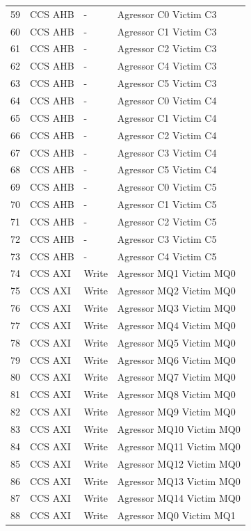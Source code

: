 \begin{center}
\begin{longtable}{|l|l|l|l|}
59 & CCS AHB &  -  &  Agressor C0 Victim C3\\
60 & CCS AHB &  -  &  Agressor C1 Victim C3\\
61 & CCS AHB &  -  &  Agressor C2 Victim C3\\
62 & CCS AHB &  -  &  Agressor C4 Victim C3\\
63 & CCS AHB &  -  &  Agressor C5 Victim C3\\
64 & CCS AHB &  -  &  Agressor C0 Victim C4\\
65 & CCS AHB &  -  &  Agressor C1 Victim C4\\
66 & CCS AHB &  -  &  Agressor C2 Victim C4\\
67 & CCS AHB &  -  &  Agressor C3 Victim C4\\
68 & CCS AHB &  -  &  Agressor C5 Victim C4\\
69 & CCS AHB &  -  &  Agressor C0 Victim C5\\
70 & CCS AHB &  -  &  Agressor C1 Victim C5\\
71 & CCS AHB &  -  &  Agressor C2 Victim C5\\
72 & CCS AHB &  -  &  Agressor C3 Victim C5\\
73 & CCS AHB &  -  &  Agressor C4 Victim C5\\
74 & CCS AXI & Write &  Agressor MQ1 Victim MQ0\\
75 & CCS AXI & Write &  Agressor MQ2 Victim MQ0\\
76 & CCS AXI & Write &  Agressor MQ3 Victim MQ0\\
77 & CCS AXI & Write &  Agressor MQ4 Victim MQ0\\
78 & CCS AXI & Write &  Agressor MQ5 Victim MQ0\\
79 & CCS AXI & Write &  Agressor MQ6 Victim MQ0\\
80 & CCS AXI & Write &  Agressor MQ7 Victim MQ0\\
81 & CCS AXI & Write &  Agressor MQ8 Victim MQ0\\
82 & CCS AXI & Write &  Agressor MQ9 Victim MQ0\\
83 & CCS AXI & Write &  Agressor MQ10 Victim MQ0\\
84 & CCS AXI & Write &  Agressor MQ11 Victim MQ0\\
85 & CCS AXI & Write &  Agressor MQ12 Victim MQ0\\
86 & CCS AXI & Write &  Agressor MQ13 Victim MQ0\\
87 & CCS AXI & Write &  Agressor MQ14 Victim MQ0\\
88 & CCS AXI & Write &  Agressor MQ0 Victim MQ1\\

\end{longtable}
\end{center}
